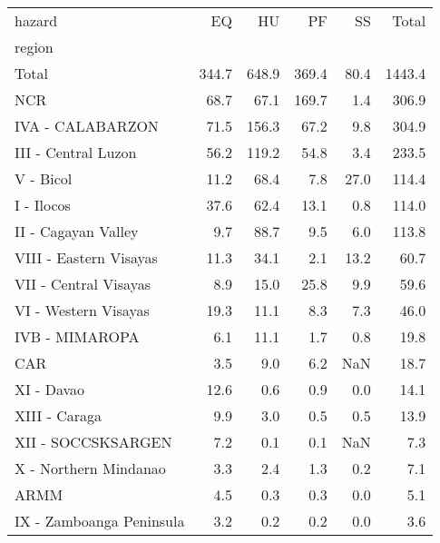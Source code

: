 \begin{tabular}{lrrrrr}
\toprule
hazard &     EQ &     HU &     PF &    SS &   Total \\
region                   &        &        &        &       &         \\
\midrule
Total                    &  344.7 &  648.9 &  369.4 &  80.4 &  1443.4 \\
NCR                      &   68.7 &   67.1 &  169.7 &   1.4 &   306.9 \\
IVA - CALABARZON         &   71.5 &  156.3 &   67.2 &   9.8 &   304.9 \\
III - Central Luzon      &   56.2 &  119.2 &   54.8 &   3.4 &   233.5 \\
V - Bicol                &   11.2 &   68.4 &    7.8 &  27.0 &   114.4 \\
I - Ilocos               &   37.6 &   62.4 &   13.1 &   0.8 &   114.0 \\
II - Cagayan Valley      &    9.7 &   88.7 &    9.5 &   6.0 &   113.8 \\
VIII - Eastern Visayas   &   11.3 &   34.1 &    2.1 &  13.2 &    60.7 \\
VII - Central Visayas    &    8.9 &   15.0 &   25.8 &   9.9 &    59.6 \\
VI - Western Visayas     &   19.3 &   11.1 &    8.3 &   7.3 &    46.0 \\
IVB - MIMAROPA           &    6.1 &   11.1 &    1.7 &   0.8 &    19.8 \\
CAR                      &    3.5 &    9.0 &    6.2 &   NaN &    18.7 \\
XI - Davao               &   12.6 &    0.6 &    0.9 &   0.0 &    14.1 \\
XIII - Caraga            &    9.9 &    3.0 &    0.5 &   0.5 &    13.9 \\
XII - SOCCSKSARGEN       &    7.2 &    0.1 &    0.1 &   NaN &     7.3 \\
X - Northern Mindanao    &    3.3 &    2.4 &    1.3 &   0.2 &     7.1 \\
ARMM                     &    4.5 &    0.3 &    0.3 &   0.0 &     5.1 \\
IX - Zamboanga Peninsula &    3.2 &    0.2 &    0.2 &   0.0 &     3.6 \\
\bottomrule
\end{tabular}
